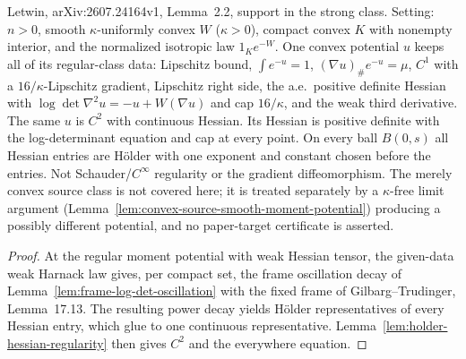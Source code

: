 \begin{lemma}
  \label{lem:regular-moment-hessian-holder}
  \leanok
  Letwin, arXiv:2607.24164v1, Lemma~2.2, support in the strong class. Setting: $n>0$, smooth $\kappa$-uniformly convex $W$
  ($\kappa>0$), compact convex $K$ with nonempty interior, and the normalized isotropic law $1_K e^{-W}$. One convex potential
  $u$ keeps all of its regular-class data: Lipschitz bound, $\int e^{-u}=1$, $(\nabla u)_{\#}e^{-u}=\mu$, $C^1$ with a
  $16/\kappa$-Lipschitz gradient, Lipschitz right side, the a.e.\ positive definite Hessian with
  $\log\det\nabla^2u=-u+W(\nabla u)$ and cap $16/\kappa$, and the weak third derivative. The same $u$ is $C^2$ with continuous
  Hessian. Its Hessian is positive definite with the log-determinant equation and cap at every point. On every ball
  $B(0,s)$ all Hessian entries are Hölder with one exponent and constant chosen before the entries. Not Schauder/$C^\infty$
  regularity or the gradient diffeomorphism. The merely convex source class is not covered here; it is treated
  separately by a $\kappa$-free limit argument (Lemma~\ref{lem:convex-source-smooth-moment-potential}) producing a possibly different potential, and no paper-target
  certificate is asserted.
\end{lemma}
\begin{proof}
  \leanok
  At the regular moment potential with weak Hessian tensor, the given-data weak Harnack law gives, per compact set, the
  frame oscillation decay of Lemma~\ref{lem:frame-log-det-oscillation} with the fixed frame of Gilbarg--Trudinger,
  Lemma~17.13. The resulting power decay yields Hölder representatives of every Hessian entry, which glue to one continuous
  representative. Lemma~\ref{lem:holder-hessian-regularity} then gives $C^2$ and the everywhere equation.
\end{proof}

